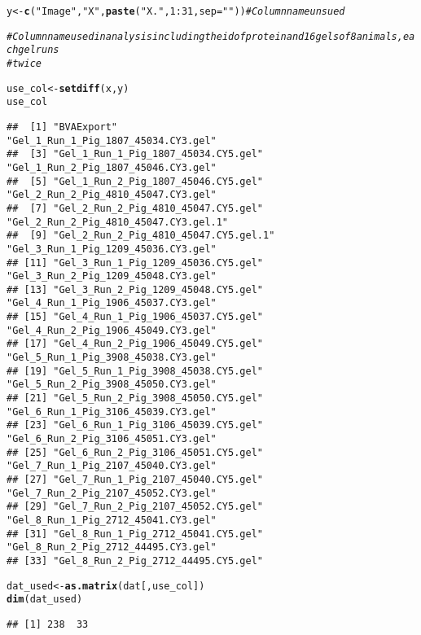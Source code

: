 \documentclass{article}\usepackage[]{graphicx}\usepackage[]{color}
\makeatletter
\newcommand{\hlnum}[1]{\textcolor[rgb]{0.686,0.059,0.569}{#1}}%
\newcommand{\hlstr}[1]{\textcolor[rgb]{0.192,0.494,0.8}{#1}}%
\newcommand{\hlcom}[1]{\textcolor[rgb]{0.678,0.584,0.686}{\textit{#1}}}%
\newcommand{\hlopt}[1]{\textcolor[rgb]{0,0,0}{#1}}%
\newcommand{\hlstd}[1]{\textcolor[rgb]{0.345,0.345,0.345}{#1}}%
\newcommand{\hlkwb}[1]{\textcolor[rgb]{0.69,0.353,0.396}{#1}}%
\newcommand{\hlkwc}[1]{\textcolor[rgb]{0.333,0.667,0.333}{#1}}%
\newcommand{\hlkwd}[1]{\textcolor[rgb]{0.737,0.353,0.396}{\textbf{#1}}}%
\newenvironment{kframe}{%
 \def\at@end@of@kframe{}%
 \ifinner\ifhmode%
  \def\at@end@of@kframe{\end{minipage}}%
  \begin{minipage}{\columnwidth}%
 \fi\fi%
 \def\FrameCommand##1{\hskip\@totalleftmargin \hskip-\fboxsep
 \colorbox{shadecolor}{##1}\hskip-\fboxsep
     \hskip-\linewidth \hskip-\@totalleftmargin \hskip\columnwidth}%
 \MakeFramed {\advance\hsize-\width
   \@totalleftmargin\z@ \linewidth\hsize
   \@setminipage}}%
 {\par\unskip\endMakeFramed%
 \at@end@of@kframe}
\newenvironment{knitrout}{}{} %
\makeatother
\begin{document}
\begin{knitrout}
\color{fgcolor}\begin{kframe}
\begin{alltt}
\hlstd{y} \hlkwb{<-} \hlkwd{c}\hlstd{(}\hlstr{"Image"}\hlstd{,} \hlstr{"X"}\hlstd{,} \hlkwd{paste}\hlstd{(}\hlstr{"X."}\hlstd{,} \hlnum{1}\hlopt{:}\hlnum{31}\hlstd{,} \hlkwc{sep} \hlstd{=} \hlstr{""}\hlstd{))}  \hlcom{# Column name unsued}

\hlcom{# Column name used in analysis including the id of protein and 16 gels of 8 animals, each gel runs}
\hlcom{# twice}

\hlstd{use_col} \hlkwb{<-} \hlkwd{setdiff}\hlstd{(x, y)}
\hlstd{use_col}
\end{alltt}
\begin{verbatim}
##  [1] "BVAExport"                            "Gel_1_Run_1_Pig_1807_45034.CY3.gel"  
##  [3] "Gel_1_Run_1_Pig_1807_45034.CY5.gel"   "Gel_1_Run_2_Pig_1807_45046.CY3.gel"  
##  [5] "Gel_1_Run_2_Pig_1807_45046.CY5.gel"   "Gel_2_Run_2_Pig_4810_45047.CY3.gel"  
##  [7] "Gel_2_Run_2_Pig_4810_45047.CY5.gel"   "Gel_2_Run_2_Pig_4810_45047.CY3.gel.1"
##  [9] "Gel_2_Run_2_Pig_4810_45047.CY5.gel.1" "Gel_3_Run_1_Pig_1209_45036.CY3.gel"  
## [11] "Gel_3_Run_1_Pig_1209_45036.CY5.gel"   "Gel_3_Run_2_Pig_1209_45048.CY3.gel"  
## [13] "Gel_3_Run_2_Pig_1209_45048.CY5.gel"   "Gel_4_Run_1_Pig_1906_45037.CY3.gel"  
## [15] "Gel_4_Run_1_Pig_1906_45037.CY5.gel"   "Gel_4_Run_2_Pig_1906_45049.CY3.gel"  
## [17] "Gel_4_Run_2_Pig_1906_45049.CY5.gel"   "Gel_5_Run_1_Pig_3908_45038.CY3.gel"  
## [19] "Gel_5_Run_1_Pig_3908_45038.CY5.gel"   "Gel_5_Run_2_Pig_3908_45050.CY3.gel"  
## [21] "Gel_5_Run_2_Pig_3908_45050.CY5.gel"   "Gel_6_Run_1_Pig_3106_45039.CY3.gel"  
## [23] "Gel_6_Run_1_Pig_3106_45039.CY5.gel"   "Gel_6_Run_2_Pig_3106_45051.CY3.gel"  
## [25] "Gel_6_Run_2_Pig_3106_45051.CY5.gel"   "Gel_7_Run_1_Pig_2107_45040.CY3.gel"  
## [27] "Gel_7_Run_1_Pig_2107_45040.CY5.gel"   "Gel_7_Run_2_Pig_2107_45052.CY3.gel"  
## [29] "Gel_7_Run_2_Pig_2107_45052.CY5.gel"   "Gel_8_Run_1_Pig_2712_45041.CY3.gel"  
## [31] "Gel_8_Run_1_Pig_2712_45041.CY5.gel"   "Gel_8_Run_2_Pig_2712_44495.CY3.gel"  
## [33] "Gel_8_Run_2_Pig_2712_44495.CY5.gel"
\end{verbatim}
\begin{alltt}
\hlstd{dat_used} \hlkwb{<-} \hlkwd{as.matrix}\hlstd{(dat[, use_col])}
\hlkwd{dim}\hlstd{(dat_used)}
\end{alltt}
\begin{verbatim}
## [1] 238  33
\end{verbatim}
\end{kframe}
\end{knitrout}
\end{document}
